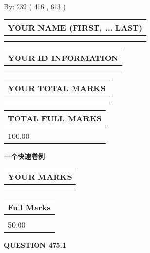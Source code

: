 \documentclass{ctexart}
\begin{document}
   
\hspace{1.0in} By: 
 239 ( 416 ,  613 )
   
   
   
   
\newpage 
\setcounter{page}{ 
   475001 } 
   
   
   
   
\noindent\begin{tabular}{|l|}
\hline
YOUR NAME (FIRST, ... LAST)  \\
\hline
 \\ 
 \\ 
\hline
\end{tabular}
\hspace{0.05in} \begin{tabular}{|l|}
\hline
 YOUR   ID   INFORMATION  \\
\hline
 \\ 
 \\ 
\hline
\end{tabular}
   
   
\vspace{0.2in}\noindent\begin{tabular}{|l|}
\hline
YOUR TOTAL MARKS  \\
\hline
 \\ 
 \\ 
\hline
\end{tabular}
\hspace{0.05in} \begin{tabular}{|l|}
\hline
TOTAL FULL MARKS  \\
\hline
 \\ 
100.00 \\
\hline
\end{tabular}
   
   
 \vspace{0.2in}
{\LARGE {\textbf{ 一个快速卷例}}}
   
   
  
\vspace{0.2in}
  
\noindent\begin{tabular}{|l|}
\hline
 YOUR MARKS  \\
\hline
 \\ 
 \\ 
\hline
\end{tabular}
\hspace{0.05in} \begin{tabular}{|l|}
\hline
 Full Marks  \\
\hline
 \\ 
50.00 \\
\hline
\end{tabular}
{\textbf{\Large{QUESTION
475.1 
}}}
  
\end{document}
